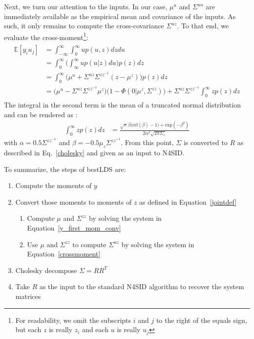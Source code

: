 Next, we turn our attention to the inputs. In our case, $\mu^u$ and $\Sigma^{uu}$ are immediately available as the empirical mean and covariance of the inputs. As such, it only remains to compute the cross-covariance $\Sigma^{uz}$. To that end, we evaluate the cross-moment\footnote{For readability, we omit the subscripts $i$ and $j$ to the right of the equals sign, but each $z$ is really $z_i$ and each $u$ is really $u_j$}:
\begin{align}
    \begin{split}
    \mathbb{E}[y_i u_j] & =\int_{-\infty}^\infty \int_0^\infty u p(u,z) dz du \\
    &= \int_0^\infty \Big(\int_\infty^\infty up(u|z)du\Big) p(z)dz \\
    &= \int_0^\infty \Big(\mu^u + \Sigma^{uz} \Sigma^{zz^{-1}} (z - \mu^z)\Big) p(z) dz \\
    &= \Big(\mu^{u} - \Sigma^{uz}\Sigma^{zz^{-1}}\mu^{z}\Big)\Big(1 - \Phi(0|\mu^z, \Sigma^{zz})\Big) + \Sigma^{uz}\Sigma^{zz^{-1}}\int_0^\infty z p(z) dz 
    \label{crossmoment}
    \end{split}
\end{align}
\noindent The integral in the second term is the mean of a truncated normal distribution and can be rendered as \cite{korotkov_integrals_2020}:
\begin{align*}
    \int_0^\infty z p(z) dz &= \frac{\sqrt{\pi}\beta\big(\text{erf}(\beta) - 1\big) + \text{exp}(-\beta^2)}{2\alpha^2\sqrt{2\pi\Sigma_z}}
\end{align*}
\noindent with $\alpha = 0.5\Sigma^{zz^{-1}}$ and $\beta = -0.5\mu_z\Sigma^{zz^{-1}}$. From this point, $\Sigma$ is converted to $R$ as described in Eq.~\ref{cholesky} and given as an input to N4SID.

To summarize, the steps of bestLDS are:
\begin{enumerate}
  \item Compute the moments of $y$
  \item Convert those moments to moments of $z$ as defined in Equation~\ref{jointdef}
  \begin{enumerate}
      \item Compute $\mu$ and $\Sigma^{zz}$ by solving the system in Equation~\ref{y_first_mom_conv}
      \item Use $\mu$ and $\Sigma^{zz}$ to compute $\Sigma^{uz}$ by solving the system in Equation~\ref{crossmoment}
  \end{enumerate} 
  \item Cholesky decompose $\Sigma = RR^T$
  \item Take $R$ as the input to the standard N4SID algorithm to recover the system matrices 
\end{enumerate}